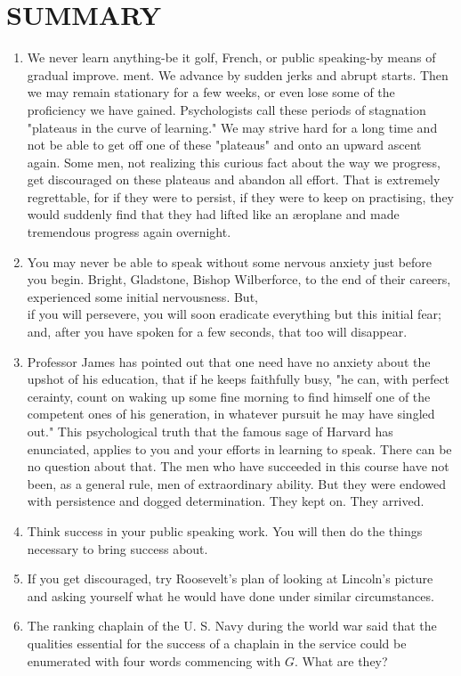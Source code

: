 \documentclass[10pt]{article}
\begin{document}
\section*{SUMMARY}
\begin{enumerate}
  \item We never learn anything-be it golf, French, or public speaking-by means of gradual improve. ment. We advance by sudden jerks and abrupt starts. Then we may remain stationary for a few weeks, or even lose some of the proficiency we have gained. Psychologists call these periods of stagnation "plateaus in the curve of learning." We may strive hard for a long time and not be able to get off one of these "plateaus" and onto an upward ascent again. Some men, not realizing this curious fact about the way we progress, get discouraged on these plateaus and abandon all effort. That is extremely regrettable, for if they were to persist, if they were to keep on practising, they would suddenly find that they had lifted like an æroplane and made tremendous progress again overnight.
  \item You may never be able to speak without some nervous anxiety just before you begin. Bright, Gladstone, Bishop Wilberforce, to the end of their careers, experienced some initial nervousness. But,\\
if you will persevere, you will soon eradicate everything but this initial fear; and, after you have spoken for a few seconds, that too will disappear.
  \item Professor James has pointed out that one need have no anxiety about the upshot of his education, that if he keeps faithfully busy, "he can, with perfect cerainty, count on waking up some fine morning to find himself one of the competent ones of his generation, in whatever pursuit he may have singled out." This psychological truth that the famous sage of Harvard has enunciated, applies to you and your efforts in learning to speak. There can be no question about that. The men who have succeeded in this course have not been, as a general rule, men of extraordinary ability. But they were endowed with persistence and dogged determination. They kept on. They arrived.
  \item Think success in your public speaking work. You will then do the things necessary to bring success about.
  \item If you get discouraged, try Roosevelt's plan of looking at Lincoln's picture and asking yourself what he would have done under similar circumstances.
  \item The ranking chaplain of the U. S. Navy during the world war said that the qualities essential for the success of a chaplain in the service could be enumerated with four words commencing with $G$. What are they?
\end{enumerate}
\end{document}
